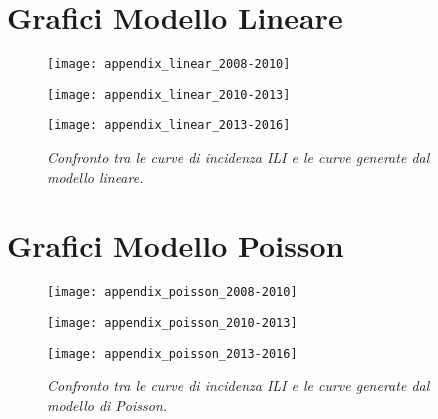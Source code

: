\chapter{Grafici Modello Lineare}

\begin{figure}[h]

\centering
\texttt{[image: appendix\_linear\_2008-2010]}

\vspace{10px}

\texttt{[image: appendix\_linear\_2010-2013]}

\vspace{10px}

\texttt{[image: appendix\_linear\_2013-2016]}
\label{fig:appendix_linear}

\caption{\textit{Confronto tra le curve di incidenza ILI e le curve generate dal modello lineare.}}

\end{figure}

\chapter{Grafici Modello Poisson}

\begin{figure}[h]

\centering
\texttt{[image: appendix\_poisson\_2008-2010]}

\vspace{10px}

\texttt{[image: appendix\_poisson\_2010-2013]}

\vspace{10px}

\texttt{[image: appendix\_poisson\_2013-2016]}

\label{fig:appendix_poisson}
\caption{\textit{Confronto tra le curve di incidenza ILI e le curve generate dal modello di Poisson.}}

\end{figure}